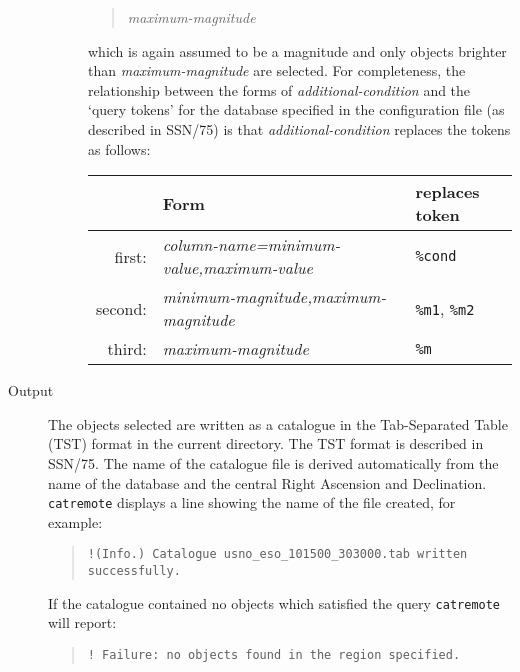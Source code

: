 \documentclass[twoside,11pt]{article}
\newcommand{\xref}[3]{#1}
\renewcommand{\_}{\texttt{\symbol{95}}}
\begin{document}
\begin{description}
\begin{description}
    \begin{quote}
     {\it maximum-magnitude}
    \end{quote}

     which is again assumed to be a magnitude and only objects brighter
     than {\it maximum-magnitude}\/ are selected.  For completeness, the
     relationship between the forms of {\it additional-condition}\/ and
     the `query tokens' for the database specified in the configuration
     file (as described in \xref{SSN/75}{ssn75}{}\cite{SSN75}) is that
     {\it additional-condition}\/ replaces the tokens as follows:

    \begin{center}
    \begin{tabular}{rll}
             & Form                                & replaces token \\ \hline
     first:  & {\it column-name=minimum-value,maximum-value} & {\tt \%cond} \\
     second: & {\it minimum-magnitude,maximum-magnitude}     & {\tt \%m1},
                                                               {\tt \%m2} \\
     third:  & {\it maximum-magnitude}                       & {\tt \%m}  \\
    \end{tabular}
    \end{center}

  \end{description}

  \item[Output] The objects selected are written as a catalogue in the
   Tab-Separated Table (TST) format in the current directory.  The TST
   format is described in \xref{SSN/75}{ssn75}{}\cite{SSN75}.  The name
   of the catalogue file is derived automatically from the name of the
   database and the central Right Ascension and Declination.  {\tt
   catremote} displays a line showing the name of the file created,
   for example:

  \begin{quote}
   \verb+!(Info.) Catalogue usno_eso_101500_303000.tab written successfully.+
  \end{quote}

   If the catalogue contained no objects which satisfied the query
   {\tt catremote} will report:

  \begin{quote}
   \verb+! Failure: no objects found in the region specified.+
  \end{quote}

\end{description}
\end{document}
